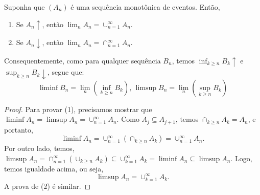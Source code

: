 \begin{frame}
\begin{teo}Suponha que $(A_n)$ é uma sequência monotônica de eventos.
Então,
\begin{enumerate}
\item Se $A_n\uparrow$, então $\lim_n A_n=\cup_{n=1}^{\infty}A_n$.

\item Se $A_n\downarrow$, então $\lim_n A_n=\cap_{n=1}^{\infty}A_n$.
\end{enumerate}

Consequentemente, como para qualquer sequência $B_n$, temos
$\inf_{k\geq n}B_k\uparrow$ e $\sup_{k\geq n}B_k\downarrow$, segue
que:
$$\liminf B_n=\lim_n(\inf_{k\geq n}B_k)\mbox{, }\limsup B_n=\lim_n(\sup_{k\geq n}B_k)$$
\end{teo}

\begin{proof} Para provar (1), precisamos mostrar que $\liminf A_n=\limsup
A_n=\cup_{n=1}^{\infty} A_n.$ Como $A_j\subseteq A_{j+1}$, temos
$\cap_{k\geq n}A_k=A_n$, e portanto,
$$\liminf A_n=\cup_{n=1}^{\infty}(\cap_{k\geq n}A_k)=\cup_{n=1}^{\infty}A_n.$$
Por outro lado, temos, $\limsup A_n=\cap_{n=1}^{\infty}(\cup_{k\geq n}A_k)\subseteq
\cup_{k=1}^{\infty}A_k=\liminf A_n\subseteq \limsup A_n. $
Logo, temos igualdade acima, ou seja, $$\limsup
A_n=\cup_{k=1}^{\infty}A_k.$$
A prova de (2) é similar. \end{proof}
%
\end{frame}
%
